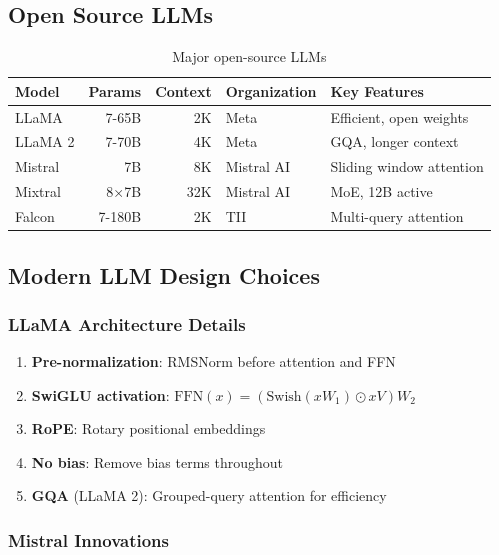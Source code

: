 \subsection{Open Source LLMs}

\begin{table}[H]
\centering
\caption{Major open-source LLMs}
\begin{tabularx}{\textwidth}{lrrlX}
\toprule
\textbf{Model} & \textbf{Params} & \textbf{Context} & \textbf{Organization} & \textbf{Key Features} \\
\midrule
LLaMA & 7-65B & 2K & Meta & Efficient, open weights \\
LLaMA 2 & 7-70B & 4K & Meta & GQA, longer context \\
Mistral & 7B & 8K & Mistral AI & Sliding window attention \\
Mixtral & 8×7B & 32K & Mistral AI & MoE, 12B active \\
Falcon & 7-180B & 2K & TII & Multi-query attention \\
\bottomrule
\end{tabularx}
\end{table}

\subsection{Modern LLM Design Choices}

\subsubsection{LLaMA Architecture Details}

\begin{enumerate}
    \item \textbf{Pre-normalization}: RMSNorm before attention and FFN
    \item \textbf{SwiGLU activation}: $\text{FFN}(x) = (\text{Swish}(xW_1) \odot xV)W_2$
    \item \textbf{RoPE}: Rotary positional embeddings
    \item \textbf{No bias}: Remove bias terms throughout
    \item \textbf{GQA} (LLaMA 2): Grouped-query attention for efficiency
\end{enumerate}

\subsubsection{Mistral Innovations}

